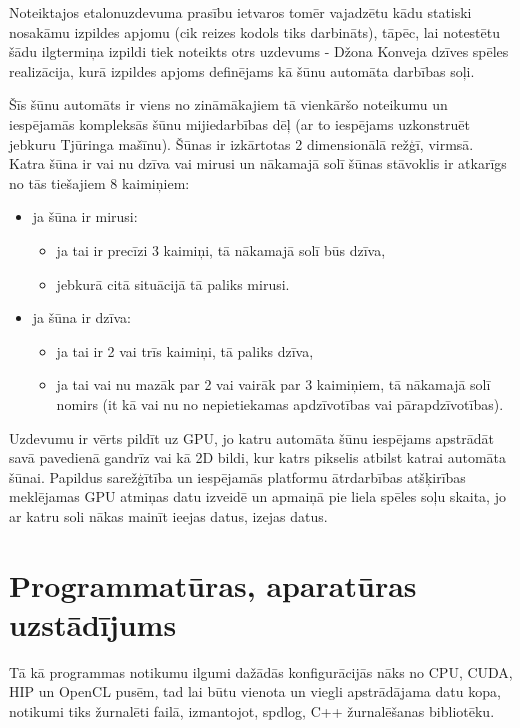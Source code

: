Noteiktajos etalonuzdevuma prasību ietvaros tomēr vajadzētu kādu statiski
nosakāmu izpildes apjomu (cik reizes kodols tiks darbināts), tāpēc, lai
notestētu šādu ilgtermiņa izpildi tiek noteikts otrs uzdevums - Džona Konveja
dzīves spēles \cite{conway1970conway} realizācija, kurā izpildes apjoms
definējams kā šūnu automāta darbības soļi.

Šīs šūnu automāts ir viens no zināmākajiem tā vienkāršo noteikumu un iespējamās
kompleksās šūnu mijiedarbības dēļ (ar to iespējams uzkonstruēt jebkuru Tjūringa
mašīnu).\cite{conway1970conway} Šūnas ir izkārtotas 2 dimensionālā režģī, virmsā. Katra šūna ir vai nu
dzīva vai mirusi un nākamajā solī šūnas stāvoklis ir atkarīgs no tās tiešajiem
8 kaimiņiem:
\begin{itemize}
    \item ja šūna ir mirusi:
        \begin{itemize}
            \item ja tai ir precīzi 3 kaimiņi, tā nākamajā solī būs dzīva,
            \item jebkurā citā situācijā tā paliks mirusi.
        \end{itemize}
    \item ja šūna ir dzīva:
        \begin{itemize}
            \item ja tai ir 2 vai trīs kaimiņi, tā paliks dzīva,
            \item ja tai vai nu mazāk par 2 vai vairāk par 3 kaimiņiem,
                tā nākamajā solī nomirs (it kā vai nu no nepietiekamas
                apdzīvotības vai pārapdzīvotības).
        \end{itemize}
\end{itemize}

Uzdevumu ir vērts pildīt uz GPU, jo katru automāta šūnu iespējams apstrādāt
savā pavedienā gandrīz vai kā 2D bildi, kur katrs pikselis atbilst katrai
automāta šūnai. Papildus sarežģītība un iespējamās platformu ātrdarbības
atšķirības meklējamas GPU atmiņas datu izveidē un apmaiņā pie liela spēles soļu
skaita, jo ar katru soli nākas mainīt ieejas datus, izejas datus.


\section{Programmatūras, aparatūras uzstādījums}
Tā kā programmas notikumu ilgumi dažādās konfigurācijās nāks no CPU, CUDA, HIP
un OpenCL pusēm, tad lai būtu vienota un viegli apstrādājama datu kopa,
notikumi tiks žurnalēti failā, izmantojot, spdlog\cite{spdlog-github}, C++
žurnalēšanas bibliotēku.

